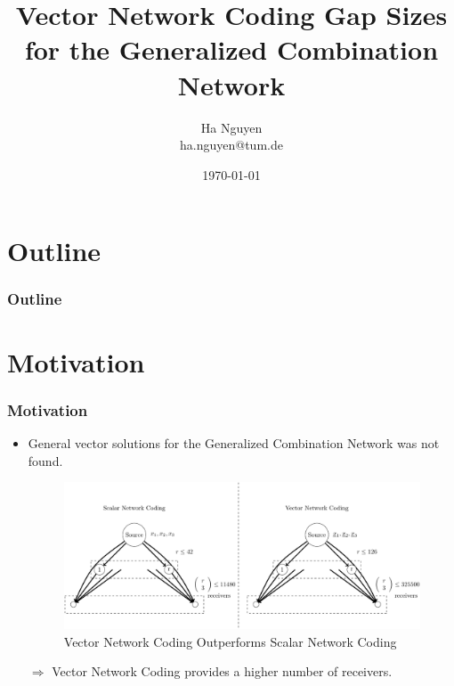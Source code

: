 \documentclass[c]{beamer}
\title[Vector Network Coding Gap Sizes for the Generalized Combination Network]{Vector Network Coding Gap Sizes for the Generalized Combination Network}
\author[Ha Nguyen]{Ha Nguyen\\ {\footnotesize \hspace{1mm} ha.nguyen@tum.de} }
\date{\today}
\begin{document}
\begin{frame}
	\titlepage
\end{frame}

\section*{Outline}
\begin{frame}
	\frametitle{Outline}
	\tableofcontents
\end{frame}


\section{Motivation}
\begin{frame}[c]
\frametitle{Motivation}
	\begin{itemize}%
		\item General vector solutions for the Generalized Combination Network was not found. 

	\begin{example}
		\begin{figure}

		\caption{Vector Network Coding Outperforms Scalar Network Coding}

		\centering{}\includegraphics[width=0.6\paperwidth]{../figures/slide_scalar_vector_nc}
		\end{figure}
	\end{example}

		\item[$\Longrightarrow$] Vector Network Coding provides a higher number of receivers.
	\end{itemize}
\end{frame}
\end{document}
